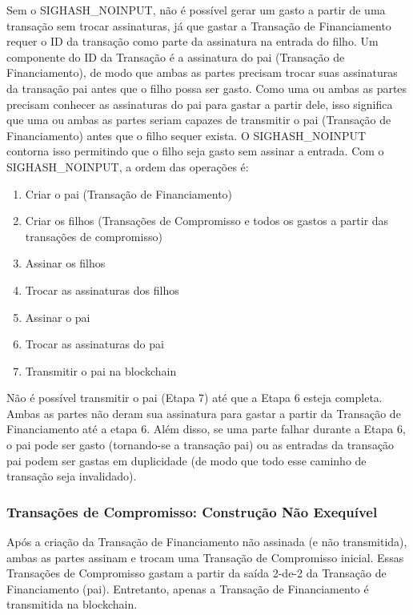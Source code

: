 \documentclass[letterpaper,11pt]{article}
\begin{document}
Sem o SIGHASH\_NOINPUT, não é possível gerar um gasto a partir de uma
transação sem trocar assinaturas, já que gastar a Transação de Financiamento
requer o ID da transação como parte da assinatura na entrada do filho. Um
componente do ID da Transação é a assinatura do pai (Transação de
Financiamento), de modo que ambas as partes precisam trocar suas assinaturas
da transação pai antes que o filho possa ser gasto. Como uma ou ambas as
partes precisam conhecer as assinaturas do pai para gastar a partir dele,
isso significa que uma ou ambas as partes seriam capazes de transmitir o pai
(Transação de Financiamento) antes que o filho sequer exista. O
SIGHASH\_NOINPUT contorna isso permitindo que o filho seja gasto sem assinar
a entrada. Com o SIGHASH\_NOINPUT, a ordem das operações é:
\begin{enumerate}
	\item Criar o pai (Transação de Financiamento)
	\item Criar os filhos (Transações de Compromisso e todos os gastos a
		partir das transações de compromisso)
	\item Assinar os filhos
	\item Trocar as assinaturas dos filhos
	\item Assinar o pai
	\item Trocar as assinaturas do pai
	\item Transmitir o pai na blockchain
\end{enumerate}

Não é possível transmitir o pai (Etapa 7) até que a Etapa 6 esteja completa.
Ambas as partes não deram sua assinatura para gastar a partir da Transação
de Financiamento até a etapa 6. Além disso, se uma parte falhar durante a
Etapa 6, o pai pode ser gasto (tornando-se a transação pai) ou as entradas
da transação pai podem ser gastas em duplicidade (de modo que todo esse
caminho de transação seja invalidado).

\subsubsection{Transações de Compromisso: Construção Não Exequível}

Após a criação da Transação de Financiamento não assinada (e não transmitida),
ambas as partes assinam e trocam uma Transação de Compromisso inicial. Essas
Transações de Compromisso gastam a partir da saída 2-de-2 da Transação de
Financiamento (pai). Entretanto, apenas a Transação de Financiamento é
transmitida na blockchain.
\end{document}
